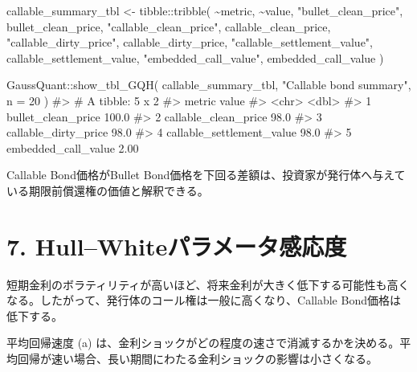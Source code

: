 \documentclass[
  letterpaper,
  DIV=11,
  numbers=noendperiod]{scrreprt}
\newenvironment{Shaded}{\begin{snugshade}}{\end{snugshade}}
\newcommand{\AttributeTok}[1]{\textcolor[rgb]{0.40,0.45,0.13}{#1}}
\newcommand{\CommentTok}[1]{\textcolor[rgb]{0.37,0.37,0.37}{#1}}
\newcommand{\DecValTok}[1]{\textcolor[rgb]{0.68,0.00,0.00}{#1}}
\newcommand{\FunctionTok}[1]{\textcolor[rgb]{0.28,0.35,0.67}{#1}}
\newcommand{\NormalTok}[1]{\textcolor[rgb]{0.00,0.23,0.31}{#1}}
\newcommand{\OtherTok}[1]{\textcolor[rgb]{0.00,0.23,0.31}{#1}}
\newcommand{\SpecialCharTok}[1]{\textcolor[rgb]{0.37,0.37,0.37}{#1}}
\newcommand{\StringTok}[1]{\textcolor[rgb]{0.13,0.47,0.30}{#1}}
\begin{document}
\begin{Shaded}
\begin{Highlighting}[]
\NormalTok{callable\_summary\_tbl }\OtherTok{\textless{}{-}}\NormalTok{ tibble}\SpecialCharTok{::}\FunctionTok{tribble}\NormalTok{(}
  \SpecialCharTok{\textasciitilde{}}\NormalTok{metric,                      }\SpecialCharTok{\textasciitilde{}}\NormalTok{value,}
  \StringTok{"bullet\_clean\_price"}\NormalTok{,          bullet\_clean\_price,}
  \StringTok{"callable\_clean\_price"}\NormalTok{,        callable\_clean\_price,}
  \StringTok{"callable\_dirty\_price"}\NormalTok{,        callable\_dirty\_price,}
  \StringTok{"callable\_settlement\_value"}\NormalTok{,   callable\_settlement\_value,}
  \StringTok{"embedded\_call\_value"}\NormalTok{,         embedded\_call\_value}
\NormalTok{)}

\NormalTok{GaussQuant}\SpecialCharTok{::}\FunctionTok{show\_tbl\_GQH}\NormalTok{(}
\NormalTok{  callable\_summary\_tbl,}
  \StringTok{"Callable bond summary"}\NormalTok{,}
  \AttributeTok{n =} \DecValTok{20}
\NormalTok{)}
\CommentTok{\#\textgreater{} \# A tibble: 5 x 2}
\CommentTok{\#\textgreater{}   metric                     value}
\CommentTok{\#\textgreater{}   \textless{}chr\textgreater{}                      \textless{}dbl\textgreater{}}
\CommentTok{\#\textgreater{} 1 bullet\_clean\_price        100.0 }
\CommentTok{\#\textgreater{} 2 callable\_clean\_price       98.0 }
\CommentTok{\#\textgreater{} 3 callable\_dirty\_price       98.0 }
\CommentTok{\#\textgreater{} 4 callable\_settlement\_value  98.0 }
\CommentTok{\#\textgreater{} 5 embedded\_call\_value         2.00}
\end{Highlighting}
\end{Shaded}

Callable Bond価格がBullet
Bond価格を下回る差額は、投資家が発行体へ与えている期限前償還権の価値と解釈できる。

\section{7.
Hull--Whiteパラメータ感応度}\label{hullwhiteux30d1ux30e9ux30e1ux30fcux30bfux611fux5fdcux5ea6}

短期金利のボラティリティが高いほど、将来金利が大きく低下する可能性も高くなる。したがって、発行体のコール権は一般に高くなり、Callable
Bond価格は低下する。

平均回帰速度 (a)
は、金利ショックがどの程度の速さで消滅するかを決める。平均回帰が速い場合、長い期間にわたる金利ショックの影響は小さくなる。
\end{document}
